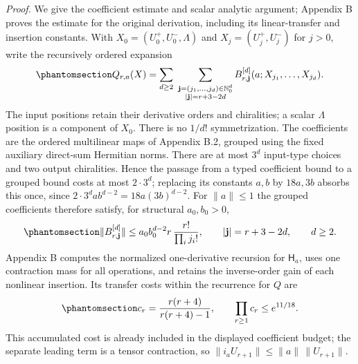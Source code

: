 \documentclass[
  english,
  11pt,
  reqno]{amsart}
\begin{document}
\emph{Proof.} We give the coefficient estimate and scalar analytic
argument; Appendix B proves the estimate for the original derivation,
including its linear-transfer and insertion constants. With
\(X_0=(U_0^+,U_0^-,\Lambda)\) and \(X_j=(U_j^+,U_j^-)\) for \(j>0\),
write the recursively ordered expansion
\begin{equation}\protect\phantomsection\label{eq:gg-ordered-polynomial-expansion}{
 Q_{r,a}(X)=\sum_{d\ge2}\ 
 \sum_{\substack{\mathbf j=(j_1,\ldots,j_d)\in\mathbb N_0^d\\
                 |\mathbf j|=r+3-2d}}
 B^{[d]}_{r,\mathbf j}(a;X_{j_1},\ldots,X_{j_d}).
}\end{equation} The input positions retain their derivative orders and
chiralities; a scalar \(\Lambda\) position is a component of \(X_0\).
There is no \(1/d!\) symmetrization. The coefficients are the ordered
multilinear maps of Appendix B.2, grouped using the fixed auxiliary
direct-sum Hermitian norms. There are at most \(3^d\) input-type choices
and two output chiralities. Hence the passage from a typed coefficient
bound to a grouped bound costs at most \(2\cdot3^d\); replacing its
constants \(a,b\) by \(18a,3b\) absorbs this once, since
\(2\cdot3^d a b^{d-2}=18a(3b)^{d-2}\). For \(\|a\|\le1\) the grouped
coefficients therefore satisfy, for structural \(a_0,b_0>0\),
\begin{equation}\protect\phantomsection\label{eq:gg-actual-coefficient-budget}{
 \|B^{[d]}_{r,\mathbf j}\|
 \le a_0b_0^{d-2}r\,\frac{r!}{\prod_i j_i!},
 \qquad
 |\mathbf j|=r+3-2d,\qquad d\ge2.
}\end{equation} Appendix B computes the normalized one-derivative
recursion for \(\mathsf H_a\), uses one contraction mass for all
operations, and retains the inverse-order gain of each nonlinear
insertion. Its transfer costs within the recurrence for \(Q\) are
\begin{equation}\protect\phantomsection\label{eq:gg-linear-transfer-product}{
 c_r=\frac{r(r+4)}{r(r+4)-1},
 \qquad
 \prod_{r\ge1}c_r\le e^{11/18}.
}\end{equation} This accumulated cost is already included in the
displayed coefficient budget; the separate leading term is a tensor
contraction, so \(\|i_aU_{r+1}\|\le\|a\|\,\|U_{r+1}\|\).
\end{document}
